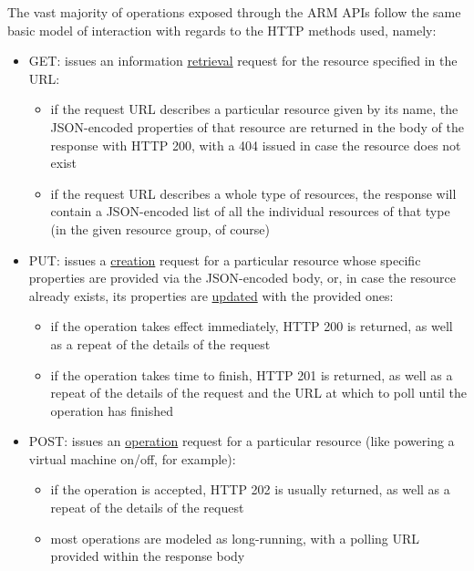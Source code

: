 \documentclass[11pt]{report}
\begin{document}
The vast majority of operations exposed through the ARM APIs follow the same
basic model of interaction with regards to the HTTP methods used, namely:

\begin{itemize}
    \item{GET}: issues an information \ul{retrieval} request for the resource
        specified in the URL:
        \begin{itemize}
            \item{} if the request URL describes a particular resource given by
                its name, the JSON-encoded properties of that resource are
                returned in the body of the response with HTTP 200, with a 404
                issued in case the resource does not exist
            \item{} if the request URL describes a whole type of resources, the
                response will contain a JSON-encoded list of all the individual
                resources of that type (in the given resource group, of course)
        \end{itemize}
    \item{PUT}: issues a \ul{creation} request for a particular resource whose
        specific properties are provided via the JSON-encoded body, or, in case
        the resource already exists, its properties are \ul{updated} with the
        provided ones:
        \begin{itemize}
            \item{} if the operation takes effect immediately, HTTP 200 is
                returned, as well as a repeat of the details of the request
            \item{} if the operation takes time to finish, HTTP 201 is
                returned, as well as a repeat of the details of the request and
                the URL at which to poll until the operation has finished
        \end{itemize}
    \item{POST}: issues an \ul{operation} request for a particular resource
        (like powering a virtual machine on/off, for example):
        \begin{itemize}
            \item{} if the operation is accepted, HTTP 202 is usually returned,
                as well as a repeat of the details of the request
            \item{} most operations are modeled as long-running, with a polling
                URL provided within the response body

\end{itemize}
\end{itemize}
\end{document}

